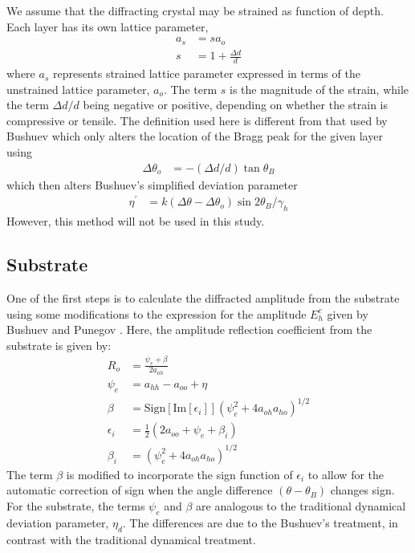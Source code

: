 We assume that the diffracting crystal may be strained as function of depth.  Each layer has its own lattice parameter,
\begin{align}
a_s &= s a_o\\
s &=1 + \frac{\Delta d}{d}
\end{align}
where $a_s$ represents strained lattice parameter expressed in terms of the unstrained lattice parameter, $a_o$.  The term $s$ is the magnitude of the strain, while the term $\Delta d/d$ being negative or positive, depending on whether the strain is compressive or tensile.  The definition used here is different from that used by Bushuev \cite{Bushuev1} which only alters the location of the Bragg peak for the given layer using
\begin{align}
\Delta \theta_o &= -(\Delta d/d) \tan \theta_B
\end{align}
which then alters Bushuev's simplified deviation parameter
\begin{align}
\eta^\prime &= k (\Delta \theta - \Delta \theta_o) \sin 2\theta_B/\gamma_h
\end{align}
However, this method will not be used in this study.

		\subsection{Substrate}

One of the first steps is to calculate the diffracted amplitude from the substrate using some modifications to the expression for the amplitude $E^c_h$ given by Bushuev \cite{Bushuev1} and Punegov \cite{Punegov15}. Here, the amplitude reflection coefficient from the substrate is given by:
\begin{align}
R_o &= \frac{\psi_e + \beta}{2a_{oh}}\\
\psi_e &= a_{hh} -a_{oo} + \eta \\
\beta&=\text{Sign}[\text{Im}[\epsilon_i]](\psi_e^2 + 4 a_{oh} a_{ho})^{1/2}\label{sign}\\
\epsilon_i&= \frac{1}{2} (2 a_{oo} + \psi_e + \beta_i)\\
\beta_i&=(\psi_e^2 + 4 a_{oh} a_{ho})^{1/2}
\end{align}
The term $\beta$ is modified to incorporate the sign function of $\epsilon_i$ to allow for the automatic correction of sign when the angle difference $(\theta-\theta_B)$ changes sign. For the substrate, the terms $\psi_e$ and $\beta$ are analogous to the traditional dynamical deviation parameter, $\eta_d$.  The differences are due to the Bushuev's treatment, in contrast with the traditional dynamical treatment.

